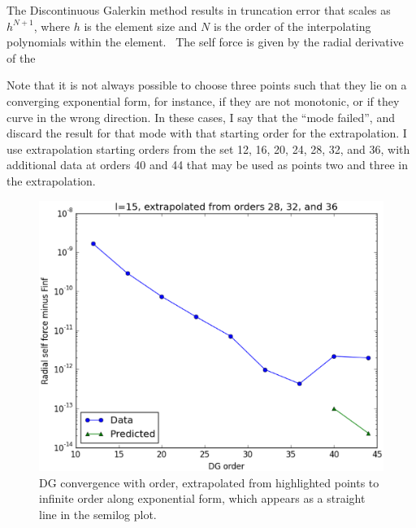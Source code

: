 The Discontinuous Galerkin method results in truncation error that scales as $h^{N+1}$, where $h$ is the element size and $N$ is the order of the interpolating polynomials within the element.~\cite{dghesthaven} The self force is given by the radial derivative of the 


Note that it is not always possible to choose three points such that they lie on a converging exponential form, for instance, if they are not monotonic, or if they curve in the wrong direction. In these cases, I say that the ``mode failed'', and discard the result for that mode with that starting order for the extrapolation. I use extrapolation starting orders from the set 12, 16, 20, 24, 28, 32, and 36, with additional data at orders 40 and 44 that may be used as points two and three in the extrapolation. 

\begin{figure}
\includegraphics{extrapolate7plot}
\caption{DG convergence with order, extrapolated from highlighted points to infinite order along exponential form, which appears as a straight line in the semilog plot.}
\end{figure}



